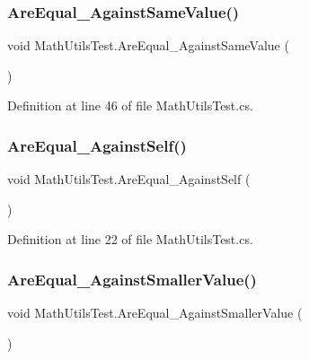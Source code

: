 \subsubsection{\texorpdfstring{Are\+Equal\+\_\+\+Against\+Same\+Value()}{AreEqual\_AgainstSameValue()}}
{\footnotesize\ttfamily void Math\+Utils\+Test.\+Are\+Equal\+\_\+\+Against\+Same\+Value (\begin{DoxyParamCaption}{ }\end{DoxyParamCaption})}



Definition at line 46 of file Math\+Utils\+Test.\+cs.

\mbox{\label{class_math_utils_test_a69c93903a64ca76e35f05fe647e9e492}} 
\subsubsection{\texorpdfstring{Are\+Equal\+\_\+\+Against\+Self()}{AreEqual\_AgainstSelf()}}
{\footnotesize\ttfamily void Math\+Utils\+Test.\+Are\+Equal\+\_\+\+Against\+Self (\begin{DoxyParamCaption}{ }\end{DoxyParamCaption})}



Definition at line 22 of file Math\+Utils\+Test.\+cs.

\mbox{\label{class_math_utils_test_ae94e968da42fc6c4bb90bafa5ab57947}} 
\subsubsection{\texorpdfstring{Are\+Equal\+\_\+\+Against\+Smaller\+Value()}{AreEqual\_AgainstSmallerValue()}}
{\footnotesize\ttfamily void Math\+Utils\+Test.\+Are\+Equal\+\_\+\+Against\+Smaller\+Value (\begin{DoxyParamCaption}{ }\end{DoxyParamCaption})}



